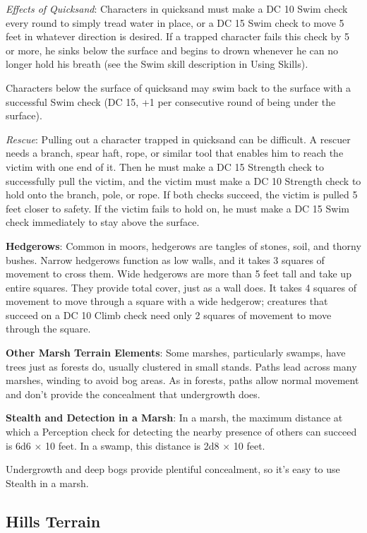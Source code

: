 \textit{Effects of Quicksand}: Characters in quicksand must make a DC 10 Swim check every round to simply tread water in place, or a DC 15 Swim check to move 5 feet in whatever direction is desired. If a trapped character fails this check by 5 or more, he sinks below the surface and begins to drown whenever he can no longer hold his breath (see the Swim skill description in Using Skills)\textit{.}
				
Characters below the surface of quicksand may swim back to the surface with a successful Swim check (DC 15, +1 per consecutive round of being under the surface).
				
\textit{Rescue}: Pulling out a character trapped in quicksand can be difficult. A rescuer needs a branch, spear haft, rope, or similar tool that enables him to reach the victim with one end of it. Then he must make a DC 15 Strength check to successfully pull the victim, and the victim must make a DC 10 Strength check to hold onto the branch, pole, or rope. If both checks succeed, the victim is pulled 5 feet closer to safety. If the victim fails to hold on, he must make a DC 15 Swim check immediately to stay above the surface. 
				
\textbf{Hedgerows}: Common in moors, hedgerows are tangles of stones, soil, and thorny bushes. Narrow hedgerows function as low walls, and it takes 3 squares of movement to cross them. Wide hedgerows are more than 5 feet tall and take up entire squares. They provide total cover, just as a wall does. It takes 4 squares of movement to move through a square with a wide hedgerow; creatures that succeed on a DC 10 Climb check need only 2 squares of movement to move through the square.
				
\textbf{Other Marsh Terrain Elements}: Some marshes, particularly swamps, have trees just as forests do, usually clustered in small stands. Paths lead across many marshes, winding to avoid bog areas. As in forests, paths allow normal movement and don't provide the concealment that undergrowth does.
				
\textbf{Stealth and Detection in a Marsh}: In a marsh, the maximum distance at which a Perception check for detecting the nearby presence of others can succeed is 6d6 \mbox{$\times$} 10 feet. In a swamp, this distance is 2d8 \mbox{$\times$} 10 feet.
				
Undergrowth and deep bogs provide plentiful concealment, so it's easy to use Stealth in a marsh.
				
\subsection{Hills Terrain}

